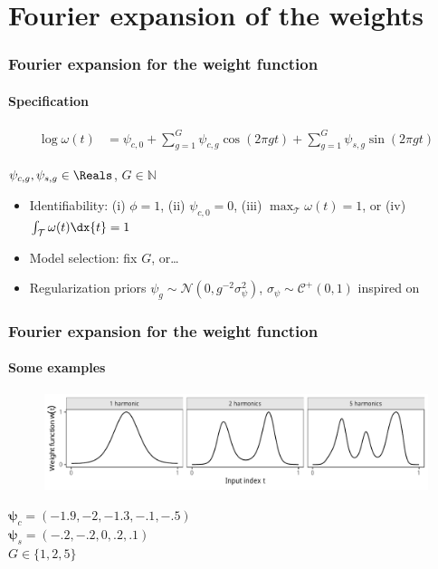 \documentclass[handout]{snedecorbeamer}
\begin{document}
\section{Fourier expansion of the weights}

\begin{frame}
  \frametitle{Fourier expansion for the weight function}
  \framesubtitle{Specification}

  \begin{align}
  \log\omega(t)
  \label{eq:few-log}
  &=\psi_{c,0} + \sum_{g = 1}^{G} \psi_{c,g}\cos\left(2\pi gt\right)
    + \sum_{g = 1}^{G} \psi_{s,g}\sin\left(2\pi gt\right)
  \end{align}
  \begin{center}
    $\psi_{c,g},\psi_{s,g}\in\Reals$, $G\in\mathbb{N}$
  \end{center}

  \vfill{}

  \begin{itemize}[<+(1)->]
  \item Identifiability: (i) $\phi = 1$, (ii) $\psi_{c,0} = 0$,
    (iii) $\max_\mathcal{T}\omega(t) = 1$, or (iv)
    $\int_\mathcal{T}\omega(t)\dx{t} = 1$
  \item Model selection: fix $G$, or\dots
  \item Regularization priors $\psi_g\sim\mathcal{N}(0,
    g^{-2}\sigma^2_\psi)$, $\sigma_\psi\sim\mathcal{C}^+(0, 1)$
    inspired on~\citep{carvalho2010}
  \end{itemize}
\end{frame}

\begin{frame}
  \frametitle{Fourier expansion for the weight function}
  \framesubtitle{Some examples
    \hyperlink{frm:FEW-G1-span}{}
  }

  \begin{figure}
    \centering
    \includegraphics[width=1\textwidth]{syn01-weight-span}
  \end{figure}

  \begin{center}
    $\bm{\psi}_{c} = (-1.9, -2, -1.3, -.1, -.5)$\\
    $\bm{\psi}_{s} = (-.2, -.2, 0, .2, .1)$\\
    $G\in\{1, 2, 5\}$
  \end{center}
\end{frame}
\end{document}
